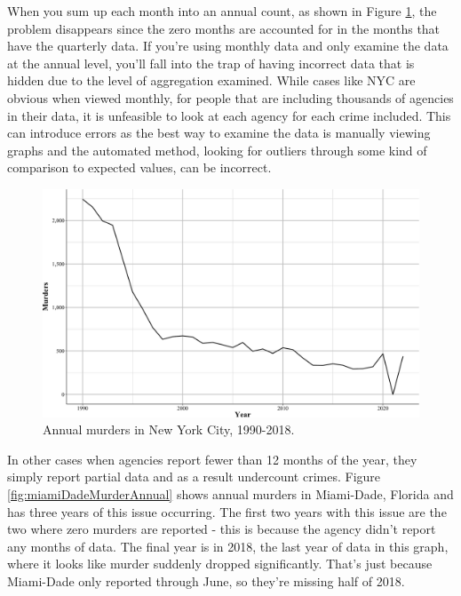\documentclass[
  12pt,
  openany]{book}
\begin{document}
When you sum up each month into an annual count, as shown in Figure \ref{fig:nycMurderYearly}, the problem disappears since the zero months are accounted for in the months that have the quarterly data. If you're using monthly data and only examine the data at the annual level, you'll fall into the trap of having incorrect data that is hidden due to the level of aggregation examined. While cases like NYC are obvious when viewed monthly, for people that are including thousands of agencies in their data, it is unfeasible to look at each agency for each crime included. This can introduce errors as the best way to examine the data is manually viewing graphs and the automated method, looking for outliers through some kind of comparison to expected values, can be incorrect.

\begin{figure}

{\centering \includegraphics[width=0.9\linewidth]{ucrbook_files/figure-latex/nycMurderYearly-1} 

}

\caption{Annual murders in New York City, 1990-2018.}\label{fig:nycMurderYearly}
\end{figure}

In other cases when agencies report fewer than 12 months of the year, they simply report partial data and as a result undercount crimes. Figure \ref{fig:miamiDadeMurderAnnual} shows annual murders in Miami-Dade, Florida and has three years of this issue occurring. The first two years with this issue are the two where zero murders are reported - this is because the agency didn't report any months of data. The final year is in 2018, the last year of data in this graph, where it looks like murder suddenly dropped significantly. That's just because Miami-Dade only reported through June, so they're missing half of 2018.
\end{document}
